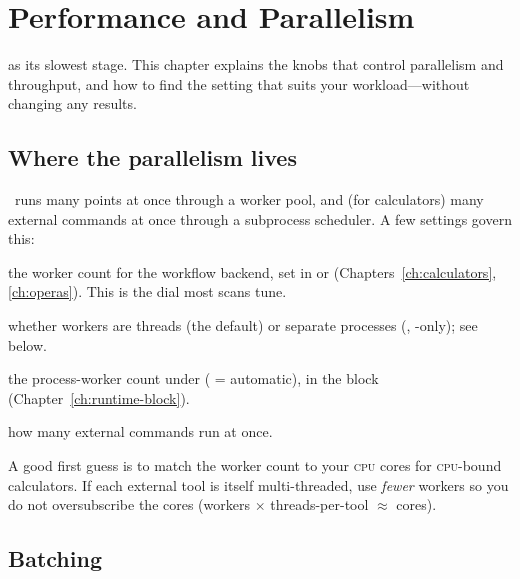 \chapter{Performance and Parallelism}
\label{ch:performance}

 as its slowest stage. This chapter explains the knobs that
control parallelism and throughput, and how to find the setting that suits your workload---without
changing any results.

\section{Where the parallelism lives}
\label{sec:perf-where}

\Jarvis\ runs many points at once through a worker pool, and (for calculators) many external
commands at once through a subprocess scheduler. A few settings govern this:

\begin{description}[style=nextline, leftmargin=1.2em]
  \item[\yamlkey{make\_paraller}] the worker count for the workflow backend, set in
         or  (Chapters~\ref{ch:calculators},
        \ref{ch:operas}). This is the dial most scans tune.
  \item[\yamlkey{Runtime.mode}] whether workers are threads (the default) or separate processes
        (, -only); see below.
  \item[\yamlkey{Runtime.workers}] the process-worker count under 
        ( = automatic), in the  block (Chapter~\ref{ch:runtime-block}).
  \item[\yamlkey{Runtime.Subprocess.max\_concurrency}] how many external commands run at once.
\end{description}

\begin{jtip}
A good first guess is to match the worker count to your \textsc{cpu} cores for \textsc{cpu}-bound
calculators. If each external tool is itself multi-threaded, use \emph{fewer} workers so you do not
oversubscribe the cores (workers $\times$ threads-per-tool $\approx$ cores).
\end{jtip}

\section{Batching}
\label{sec:perf-batching}

